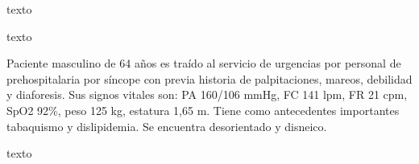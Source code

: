 \documentclass[a4paper]{article}
\begin{document}
\begin{multicols}{3}
texto

\closearticle



texto

\begin{boxClinica}

Paciente masculino de 64 años es traído al servicio de urgencias por personal
de prehospitalaria por síncope con previa historia de palpitaciones, mareos,
debilidad y diaforesis. Sus signos vitales son: PA 160/106 mmHg, FC 141 lpm,
FR 21 cpm, SpO2 92\%, peso 125 kg, estatura 1,65 m. Tiene como antecedentes
importantes tabaquismo y dislipidemia. Se encuentra desorientado y disneico.

\end{boxClinica}

texto

\end{multicols}

\closearticle

\begin{multicols}{3}

\printbibliography[heading=none]

\end{multicols}
\end{document}
